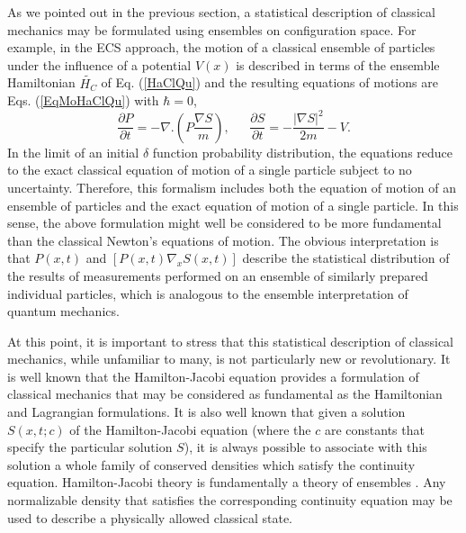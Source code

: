 \documentclass [12pt]{revtex4}
\begin{document}
As we pointed out in the previous section, a statistical description of classical mechanics may be formulated using ensembles on configuration space. For example, in the ECS approach, the motion of a classical ensemble of particles under the influence of a potential $V(x)$ is described in terms of the ensemble Hamiltonian $\tilde{H_C}$ of Eq. (\ref{HaClQu}) and the resulting equations of motions are Eqs. (\ref{EqMoHaClQu}) with $\hbar=0$,
\begin{equation}\label{EqMotion}
\frac{\partial P}{\partial t} = -\nabla .\left( P\frac{\nabla S}{m} \right),~~~~~~~
\frac{\partial S}{\partial t} = - \frac{|\nabla S|^2}{2m} - V.
\end{equation}
In the limit of an initial $\delta $ function probability distribution, the
equations reduce to the exact classical equation of motion of a
single particle subject to no uncertainty. Therefore, this formalism
includes both the equation of motion of
an ensemble of particles and the exact equation of motion of a single
particle. In this sense, the above formulation might well be considered to be more
fundamental than the classical Newton's equations of motion.
The obvious interpretation is that $P(x,t)$ and
$[P(x,t)\nabla_x S(x,t)]$ describe the statistical distribution of the
results of measurements performed on an ensemble of similarly
prepared individual particles, which is analogous to the ensemble
interpretation of quantum mechanics.

At this point, it is important to stress that this statistical
description of classical mechanics, while unfamiliar to many, is not
particularly new or revolutionary. It is well known that the
Hamilton-Jacobi equation provides a formulation of classical
mechanics that may be considered as fundamental as the Hamiltonian
and Lagrangian formulations. It is also well known that given a
solution $S(x,t;c)$ of the Hamilton-Jacobi equation (where the $c$
are constants that specify the particular solution $S$), it is
always possible to associate with this solution a whole family of
conserved densities which satisfy the continuity equation.
Hamilton-Jacobi theory is fundamentally a theory of ensembles
\cite{L1952,S1961}.  Any normalizable density that
satisfies the corresponding continuity equation may be used to
describe a physically allowed classical state.
\end{document}
